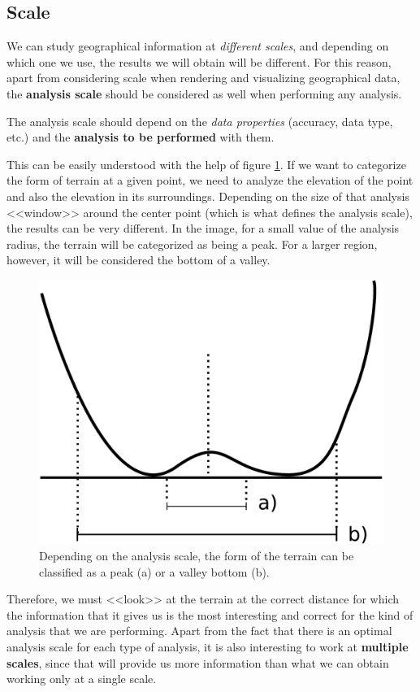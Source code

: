 \subsection{Scale}

We can study geographical information at \emph{different scales}, and depending on which one we use, the results we will obtain will be different. For this reason, apart from considering scale when rendering and visualizing geographical data, the \textbf{analysis scale} should be considered as well when performing any analysis.

The analysis scale should depend on the \emph{data properties} (accuracy, data type, etc.) and the \textbf{analysis to be performed} with them.

This can be easily understood with the help of figure \ref{Fig:Scales}. If we want to categorize the form of terrain at a given point, we need to analyze the elevation of the point and also the elevation in its surroundings. Depending on the size of that analysis <<window>> around the center point (which is what defines the analysis scale), the results can be very different. In the image, for a small value of the analysis radius, the terrain will be categorized as being a peak. For a larger region, however, it will be considered the bottom of a valley.

\begin{figure}[h]   
\centering
\includegraphics[width= .45\columnwidth]{Analysis/Scales.pdf}
\caption{\small Depending on the analysis scale, the form of the terrain can   be classified as a peak (a) or a valley bottom (b).}
\label{Fig:Scales} 
\end{figure}

Therefore, we must <<look>> at the terrain at the correct distance for which the information that it gives us is the most interesting and correct for the kind of analysis that we are performing. Apart from the fact that there is an optimal analysis scale for each type of analysis, it is also interesting to work at \textbf{multiple scales}, since that will provide us more information than what we can obtain working only at a single scale.

